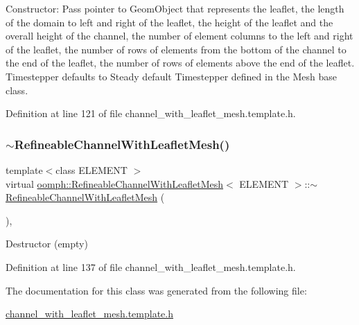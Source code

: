 Constructor\+: Pass pointer to Geom\+Object that represents the leaflet, the length of the domain to left and right of the leaflet, the height of the leaflet and the overall height of the channel, the number of element columns to the left and right of the leaflet, the number of rows of elements from the bottom of the channel to the end of the leaflet, the number of rows of elements above the end of the leaflet. Timestepper defaults to Steady default Timestepper defined in the Mesh base class. 



Definition at line 121 of file channel\+\_\+with\+\_\+leaflet\+\_\+mesh.\+template.\+h.

\mbox{\label{classoomph_1_1RefineableChannelWithLeafletMesh_aed441c6ae7a9078b649d733a033bd2b5}} 
\subsubsection{\texorpdfstring{$\sim$\+Refineable\+Channel\+With\+Leaflet\+Mesh()}{~RefineableChannelWithLeafletMesh()}}
{\footnotesize\ttfamily template$<$class E\+L\+E\+M\+E\+NT $>$ \\
virtual \hyperlink{classoomph_1_1RefineableChannelWithLeafletMesh}{oomph\+::\+Refineable\+Channel\+With\+Leaflet\+Mesh}$<$ E\+L\+E\+M\+E\+NT $>$\+::$\sim$\hyperlink{classoomph_1_1RefineableChannelWithLeafletMesh}{Refineable\+Channel\+With\+Leaflet\+Mesh} (\begin{DoxyParamCaption}{ }\end{DoxyParamCaption})\hspace{0.3cm}{\ttfamily [inline]}, {\ttfamily [virtual]}}



Destructor (empty) 



Definition at line 137 of file channel\+\_\+with\+\_\+leaflet\+\_\+mesh.\+template.\+h.



The documentation for this class was generated from the following file\+:\begin{DoxyCompactItemize}
\item 
\hyperlink{channel__with__leaflet__mesh_8template_8h}{channel\+\_\+with\+\_\+leaflet\+\_\+mesh.\+template.\+h}\end{DoxyCompactItemize}
